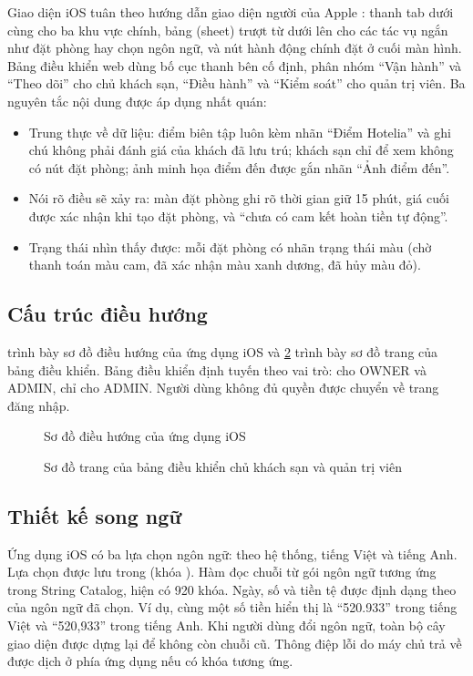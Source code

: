 Giao diện iOS tuân theo hướng dẫn giao diện người của Apple \cite{applehig}: thanh tab dưới cùng cho ba khu vực chính, bảng (sheet) trượt từ dưới lên cho các tác vụ ngắn như đặt phòng hay chọn ngôn ngữ, và nút hành động chính đặt ở cuối màn hình. Bảng điều khiển web dùng bố cục thanh bên cố định, phân nhóm ``Vận hành'' và ``Theo dõi'' cho chủ khách sạn, ``Điều hành'' và ``Kiểm soát'' cho quản trị viên. Ba nguyên tắc nội dung được áp dụng nhất quán:
\begin{itemize}
\item Trung thực về dữ liệu: điểm biên tập luôn kèm nhãn ``Điểm Hotelia'' và ghi chú không phải đánh giá của khách đã lưu trú; khách sạn chỉ để xem không có nút đặt phòng; ảnh minh họa điểm đến được gắn nhãn ``Ảnh điểm đến''.
\item Nói rõ điều sẽ xảy ra: màn đặt phòng ghi rõ thời gian giữ 15 phút, giá cuối được xác nhận khi tạo đặt phòng, và ``chưa có cam kết hoàn tiền tự động''.
\item Trạng thái nhìn thấy được: mỗi đặt phòng có nhãn trạng thái màu (chờ thanh toán màu cam, đã xác nhận màu xanh dương, đã hủy màu đỏ).
\end{itemize}

\subsection{Cấu trúc điều hướng}

 trình bày sơ đồ điều hướng của ứng dụng iOS và \cref{fig:nav-web} trình bày sơ đồ trang của bảng điều khiển. Bảng điều khiển định tuyến theo vai trò:  cho OWNER và ADMIN,  chỉ cho ADMIN. Người dùng không đủ quyền được chuyển về trang đăng nhập.

\begin{figure}[H]
\centering
{}
\caption{Sơ đồ điều hướng của ứng dụng iOS}\label{fig:nav-ios}
\end{figure}

\begin{figure}[H]
\centering
{}
\caption{Sơ đồ trang của bảng điều khiển chủ khách sạn và quản trị viên}\label{fig:nav-web}
\end{figure}

\subsection{Thiết kế song ngữ}

Ứng dụng iOS có ba lựa chọn ngôn ngữ: theo hệ thống, tiếng Việt và tiếng Anh. Lựa chọn được lưu trong  (khóa ). Hàm  đọc chuỗi từ gói ngôn ngữ tương ứng trong String Catalog, hiện có 920 khóa. Ngày, số và tiền tệ được định dạng theo  của ngôn ngữ đã chọn. Ví dụ, cùng một số tiền hiển thị là ``520.933'' trong tiếng Việt và ``520,933'' trong tiếng Anh. Khi người dùng đổi ngôn ngữ, toàn bộ cây giao diện được dựng lại để không còn chuỗi cũ. Thông điệp lỗi do máy chủ trả về được dịch ở phía ứng dụng nếu có khóa tương ứng.

